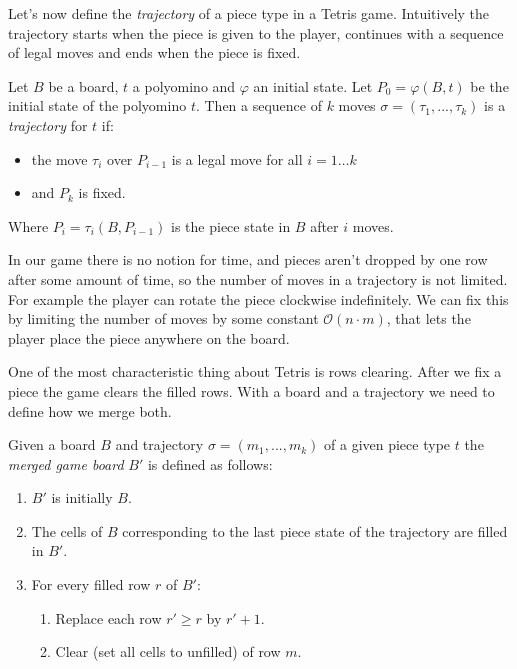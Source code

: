 \vspace{10px}
Let's now define the \emph{trajectory} of a piece type in a Tetris game. Intuitively the trajectory starts when the piece is given to the player, continues with a sequence of legal moves and ends when the piece is fixed. 

\begin{definition} 
  Let $B$ be a board, $t$ a polyomino and $\varphi$ an initial state. Let $P_0 = \varphi(B,t)$ be the initial state of the polyomino $t$. Then a sequence of $k$ moves $\sigma = (\tau_1, ..., \tau_k)$ is a \emph{trajectory} for $t$ if:

 \begin{itemize}
   \item the move $\tau_{i}$ over $P_{i-1}$ is a legal move for all $i = 1 \dots k$
  \item and $P_k$ is fixed.
 \end{itemize}
 
 Where $P_{i} = \tau_{i}(B,P_{i-1})$ is the piece state in $B$ after $i$ moves.
\end{definition}

In our game there is no notion for time, and pieces aren't dropped by one row after some amount of time, so the number of moves in a trajectory is not limited. For example the player can rotate the piece clockwise indefinitely. We can fix this by limiting the number of moves by some constant $\mathcal{O}(n \cdot m)$, that lets the player place the piece anywhere on the board.

One of the most characteristic thing about Tetris is rows clearing. After we fix a piece the game clears the filled rows. With a board and a trajectory we need to define how we merge both. 

\begin{definition} 
  Given a board $B$ and trajectory $\sigma = (m_1, ..., m_k)$ of a given piece type $t$ the \emph{merged game board} $B'$ is defined as follows:
  \begin{enumerate}
    \item $B'$ is initially $B$.
    \item The cells of $B$ corresponding to the last piece state of the trajectory are filled in $B'$.
    \item For every filled row $r$ of $B'$:
      \begin{enumerate}
        \item Replace each row $r' \geq r$ by $r'+1$.
        \item Clear (set all cells to unfilled) of row $m$.
      \end{enumerate}
  \end{enumerate}
\end{definition}

